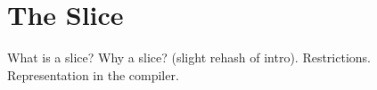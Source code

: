 \section{The Slice}

What is a slice?
Why a slice? (slight rehash of intro).
Restrictions.
Representation in the compiler.
